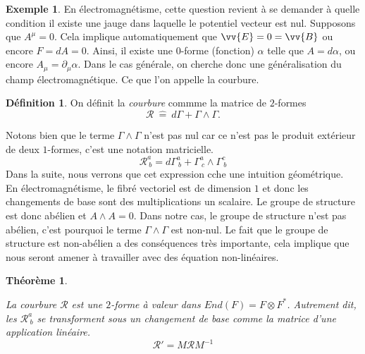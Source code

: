 \documentclass[a4paper,11pt]{report}
\theoremstyle{definition}
\theoremstyle{plain}
\newtheorem{thm}{Théorème}[chapter]
\theoremstyle{definition}
\newtheorem{defn}{Définition}[chapter]
\newtheorem{exmp}{Exemple}[chapter]
\theoremstyle{remark}
\newcommand{\p}{\partial}
\begin{document}
                \begin{exmp}
                    En électromagnétisme, cette question revient à se demander à quelle condition il existe une jauge dans laquelle le potentiel vecteur est nul. Supposons que $A^\mu = 0$. Cela implique automatiquement que $\vv{E} = 0 = \vv{B}$ ou encore $F = dA = 0$. Ainsi, il existe une $0$-forme (fonction) $\alpha$ telle que $A = d\alpha$, ou encore $A_\mu = \p_\mu\alpha$. Dans le cas générale, on cherche donc une généralisation du champ électromagnétique. Ce que l'on appelle la courbure.
                \end{exmp}
                
                \begin{defn}
                    On définit la \textit{courbure} commme la matrice de $2$-formes
                    \begin{equation}
                        \mathscr{R}~\hat{=}~d\Gamma + \Gamma\wedge\Gamma.
                    \end{equation}
                \end{defn}
                Notons bien que le terme $\Gamma\wedge\Gamma$ n'est pas nul car ce n'est pas le produit extérieur de deux $1$-formes, c'est une notation matricielle.
                \begin{equation}
                    \mathscr{R}^a_{~b} = d\Gamma^a_{~b} + \Gamma^a_{~c}\wedge\Gamma^c_{~b}
                \end{equation}
                Dans la suite, nous verrons que cet expression cche une intuition géométrique.\\
                
                En électromagnétisme, le fibré vectoriel est de dimension $1$ et donc les changements de base sont des multiplications un scalaire. Le groupe de structure est donc abélien et $A\wedge A = 0$. Dans notre cas, le groupe de structure n'est pas abélien, c'est pourquoi le terme $\Gamma\wedge\Gamma$ est non-nul. Le fait que le groupe de structure est non-abélien a des conséquences très importante, cela implique que nous seront amener à travailler avec des équation non-linéaires.
                
                \begin{thm}\begin{leftbar}
                    La courbure $\mathscr{R}$ est une $2$-forme à  valeur dans $End(F)= F\otimes F^*$. Autrement dit, les $\mathscr{R}^a_{~b}$ se transforment sous un changement de base comme la matrice d'une application linéaire.
                    \begin{equation}
                        \mathscr{R}' = M\mathscr{R}M^{-1}
                    \end{equation}
                \end{leftbar}\end{thm}
                
\end{document}
